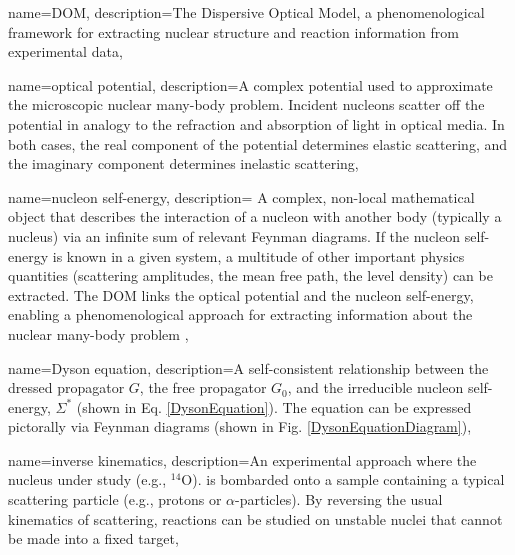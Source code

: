 
\makeglossaries


{
    name={DOM},
    description={The Dispersive Optical Model, a phenomenological framework for
    extracting nuclear structure and reaction information from experimental data},
}

{
    name={optical potential},
    description={A complex potential used to approximate the microscopic nuclear many-body problem. Incident nucleons scatter off the potential in analogy to the refraction and absorption of light in optical media.  In both cases, the real component of the potential determines elastic scattering, and the imaginary component determines inelastic scattering},
}

{
    name={nucleon self-energy},
    description={
        A complex, non-local mathematical object that describes the interaction of a
        nucleon with another body (typically a nucleus) via an infinite sum of relevant Feynman 
        diagrams. If the nucleon self-energy is known in a given system, a multitude of other 
        important physics quantities (scattering amplitudes, the mean free path, the level density) 
        can be extracted. The DOM links the optical potential and the nucleon
        self-energy, enabling a phenomenological approach for extracting
        information about the nuclear many-body problem
    },
}

{
    name={Dyson equation},
    description={A self-consistent relationship between the dressed propagator $G$, the free
        propagator $G_{0}$, and the irreducible nucleon self-energy, $\Sigma^{*}$ (shown in
        Eq. \ref{DysonEquation}). The equation can be expressed pictorally
        via Feynman diagrams (shown in Fig. \ref{DysonEquationDiagram})},
}

{
    name={inverse kinematics},
    description={An experimental approach where the nucleus under study
        (e.g., $^{14}$O). is bombarded onto a sample containing a typical
        scattering particle (e.g., protons or $\alpha$-particles).
        By reversing the usual kinematics of scattering,
        reactions can be studied on unstable nuclei that
    cannot be made into a fixed target},
}


